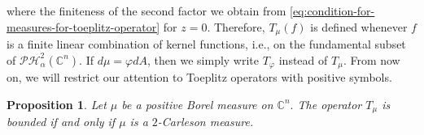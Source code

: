 \documentclass[10pt,leqno]{amsart}
\newtheorem{proposition}[theorem]{Proposition}
\theoremstyle{remark}
\numberwithin{equation}{section}
\newcommand{\hph}{\mathcal{PH}_\alpha^2(\mathbb{C}^n)}%
\newcommand{\Kph}{K_{ph,\alpha}}%
\begin{document}
where the finiteness of the second factor we obtain from \eqref{eq:condition-for-measures-for-toeplitz-operator} for $z=0.$
Therefore, $T_\mu(f)$ is defined whenever $f$  is a finite linear combination of kernel functions, i.e., on the fundamental subset of $\hph.$
If $d\mu = \varphi dA$, then we simply write $T_\varphi$ instead of $T_\mu$. From now on, we will restrict our attention to Toeplitz operators with positive symbols.
\begin{proposition}\label{prop:correspondence-between-FC-measures-and-boundedness}
	Let $\mu$ be a positive Borel measure on $\mathbb{C}^{n}.$ The operator $T_\mu$ is bounded if and only if $\mu $ is a $2$-Carleson measure.
\end{proposition}
\end{document}
